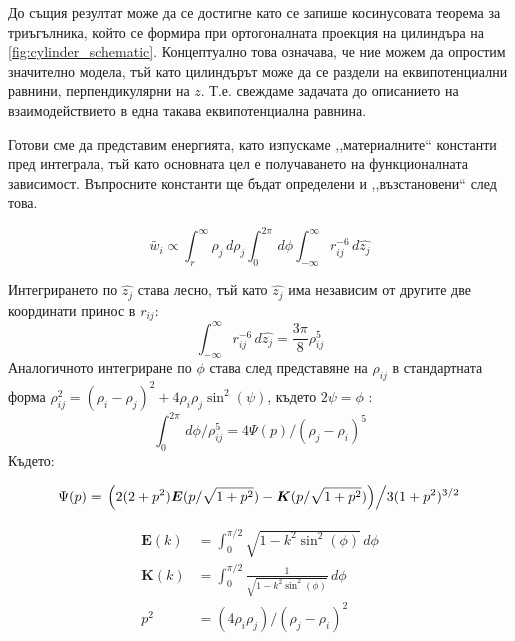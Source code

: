 До същия резултат може да се достигне като се запише косинусовата теорема за триъгълника, който се формира при ортогоналната проекция на цилиндъра на \autoref{fig:cylinder_schematic}.
Концептуално това означава, че ние можем да опростим значително модела, тъй като цилиндърът може да се раздели на еквипотенциални равнини, перпендикулярни на $z$. Т.е. свеждаме задачата
до описанието на взаимодействието в една такава еквипотенциална равнина.

Готови сме да представим енергията, като изпускаме ,,материалните`` константи пред интеграла, тъй като основната цел е получаването на функционалната зависимост. Въпросните константи ще бъдат
определени и ,,възстановени`` след това.

\begin{equation}
	\label{eq:energy_integral_raw}
	\tilde{w_i} \displaystyle\propto \displaystyle\int_{r}^{\infty} \rho_{j} \,d\rho_{j} \displaystyle\int_{0}^{2\pi} \,d\phi \displaystyle\int_{-\infty}^{\infty} r_{ij}^{-6} \,d\hat{z_{j}}
\end{equation}

Интегрирането по $\hat{z_j}$ става лесно, тъй като $\hat{z_{j}}$ има независим от другите две координати принос в $r_{ij}$:
\begin{equation*}
	\displaystyle\int_{-\infty}^{\infty} r_{ij}^{-6} \,d\hat{z_{j}} = \frac{3\pi}{8} \rho_{ij}^5
\end{equation*}
Аналогичното интегриране по $\phi$ става след представяне на $\rho_{ij}$ в стандартната форма $\rho_{ij}^2 = (\rho_i - \rho_j)^2 + 4 \rho_i \rho_j \sin^2(\psi)$, където $2\psi=\phi$ \cite{gradshteyn}:
\begin{equation*}
	\displaystyle\int_{0}^{2\pi} \,d\phi/\rho_{ij}^5 = 4\Psi(p)/(\rho_j-\rho_i)^5
\end{equation*}
Където:

\begin{equation}
	\label{eq:psi_func}
	\Psi(p)           = \left. \left(2(2+p^2)\boldsymbol{E}(p/\sqrt{1+p^2}) - \boldsymbol{K}(p/\sqrt{1+p^2})\right)\middle/3(1+p^2)^{3/2}\right.
\end{equation}

\begin{align*}
	\boldsymbol{E}(k) & = \displaystyle\int_{0}^{\pi/2} \sqrt{1-k^2 \sin^2(\phi)} \,d\phi           \\
	\boldsymbol{K}(k) & = \displaystyle\int_{0}^{\pi/2} \frac{1}{\sqrt{1-k^2 \sin^2(\phi)}} \,d\phi \\
	p^2               & = (4 \rho_i \rho_j)/(\rho_j - \rho_i)^2
\end{align*}

